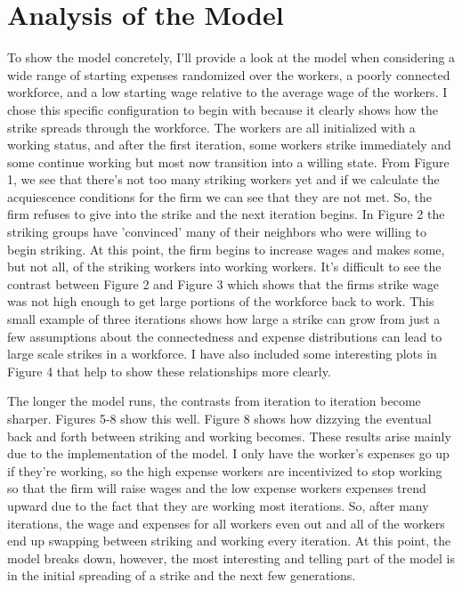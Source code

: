 \documentclass[11pt]{article}
\begin{document}
\section{Analysis of the Model} \hrulefill

To show the model concretely, I'll provide a look at the model when considering a wide range of starting expenses randomized over the workers, a poorly connected workforce, and a low starting wage relative to the average wage of the workers. I chose this specific configuration to begin with because it clearly shows how the strike spreads through the workforce. The workers are all initialized with a working status, and after the first iteration, some workers strike immediately and some continue working but most now transition into a willing state.  From Figure 1, we see that there's not too many striking workers yet and if we calculate the acquiescence conditions for the firm we can see that they are not met. So, the firm refuses to give into the strike and the next iteration begins. In Figure 2 the striking groups have 'convinced' many of their neighbors who were willing to begin striking. At this point, the firm begins to increase wages and makes some, but not all, of the striking workers into working workers. It's difficult to see the contrast between Figure 2 and Figure 3 which shows that the firms strike wage was not high enough to get large portions of the workforce back to work. This small example of three iterations shows how large a strike can grow from just a few assumptions about the connectedness and expense distributions can lead to large scale strikes in a workforce. I have also included some interesting plots in Figure 4 that help to show these relationships more clearly. 

The longer the model runs, the contrasts from iteration to iteration become sharper. Figures 5-8 show this well. Figure 8 shows how dizzying the eventual back and forth between striking and working becomes. These results arise mainly due to the implementation of the model. I only have the worker's expenses go up if they're working, so the high expense workers are incentivized to stop working so that the firm will raise wages and the low expense workers expenses trend upward due to the fact that they are working most iterations. So, after many iterations, the wage and expenses for all workers even out and all of the workers end up swapping between striking and working every iteration. At this point, the model breaks down, however, the most interesting and telling part of the model is in the initial spreading of a strike and the next few generations. 
\end{document}
